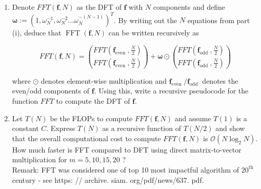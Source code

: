 \documentclass{report}
\begin{document}
{\begin{enumerate}[label=(\alph*)]
\begin{enumerate}[label=(\roman*)]
			            Hint: Express $\omega_{\frac{N}{2}}$ in terms of $\omega_{N}$.\\
			      \item Denote $F F T(\boldsymbol{f}, N)$ as the DFT of $\boldsymbol{f}$ with $N$ components and define $\boldsymbol{\omega}:=\left(1, \omega_{N}^{-1}, \omega_{N}^{-2} \ldots \omega_{N}^{-(N-1)}\right)^{T}$. By writing out the $N$ equations from part (i), deduce that $\operatorname{FFT}(\boldsymbol{f}, N)$ can be written recursively as

			            $$
				            F F T(\boldsymbol{f}, N)=\binom{F F T\left(\boldsymbol{f}_{\text {even }}, \frac{N}{2}\right)}{F F T\left(\boldsymbol{f}_{\text {even }}, \frac{N}{2}\right)}+\boldsymbol{\omega} \odot\binom{F F T\left(\boldsymbol{f}_{\text {odd }}, \frac{N}{2}\right)}{F F T\left(\boldsymbol{f}_{\text {odd }}, \frac{N}{2}\right)}
			            $$

			            where $\odot$ denotes element-wise multiplication and $\boldsymbol{f}_{\text {even }} / \boldsymbol{f}_{\text {odd }}$ denotes the even/odd components of $\boldsymbol{f}$. Using this, write a recursive pseudocode for the function $F F T$ to compute the DFT of $\boldsymbol{f}$.\\
			      \item Let $T(N)$ be the FLOPs to compute $F F T(\boldsymbol{f}, N)$ and assume $T(1)$ is a constant $C$. Express $T(N)$ as a recursive function of $T(N / 2)$ and show that the overall computational cost to compute $F F T(\boldsymbol{f}, N)$ is $\mathcal{O}\left(N \log _{2} N\right)$. How much faster is FFT compared to DFT using direct matrix-to-vector multiplication for $m=5,10,15,20$ ?\\
			            Remark: FFT was considered one of top 10 most impactful algorithm of $20^{\text {th }}$ century - see https: // archive. siam. org/pdf/news/637. pdf.
		      \end{enumerate}
	\end{enumerate}
}
\end{document}
